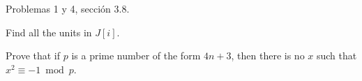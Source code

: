 




Problemas 1 y 4, sección 3.8.


\begin{problema}[Problema 1]
    Find all the units in $J[i]$.
    \begin{dem}
    \end{dem}
\end{problema}

\begin{problema}[Problema 4]
    Prove that if $p$ is a prime number of the form $4 n+3$, then there is no $x$ such that $x^2 \equiv-1 \bmod p$.
    \begin{dem}
    \end{dem}
\end{problema}

%
%

